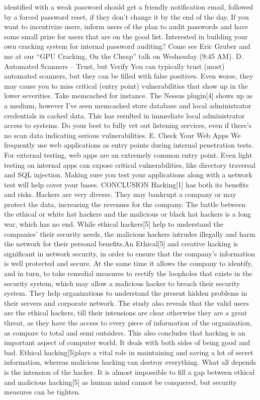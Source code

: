 identified with a weak password should get a friendly 
notification email, followed by a forced password reset, if 
they don’t change it by the end of the day. If you want to 
incentivize users, inform users of the plan to audit 
passwords and have some small prize for users that are on 
the good list. 
Interested in building your own cracking system for 
internal password auditing? Come see Eric Gruber and me 
at our “GPU Cracking, On the Cheap” talk on Wednesday 
(9:45 AM). 
D. Automated Scanners – Trust, but Verify 
You can typically trust (most) automated scanners, but they 
can be filled with false positives. Even worse, they may 
cause you to miss critical (entry point) vulnerabilities that 
show up in the lower severities. Take memcached for 
instance. The Nessus plugin[4] shows up as a medium, 
however I’ve seen memcached store database and local 
administrator credentials in cached data. This has resulted 
in immediate local administrator access to systems. Do 
your best to fully vet out listening services, even if there’s 
no scan data indicating serious vulnerabilities. 
E. Check Your Web Apps 
We frequently use web applications as entry points during 
internal penetration tests. For external testing, web apps are 
an extremely common entry point. Even light testing on 
internal apps can expose critical vulnerabilities, like 
directory traversal and SQL injection. Making sure you test 
your applications along with a network test will help cover 
your bases. 
CONCLUSION 
Hacking[1] has both its benefits and risks. Hackers are very 
diverse. They may bankrupt a company or may protect the 
data, increasing the revenues for the company. The battle 
between the ethical or white hat hackers and the malicious 
or black hat hackers is a long war, which has no end. While 
ethical hackers[5] help to understand the companies’ their 
security needs, the malicious hackers intrudes illegally and 
harm the network for their personal benefits.An Ethical[5] 
and creative hacking is significant in network security, in 
order to ensure that the company’s information is well 
protected and secure. At the same time it allows the 
company to identify, and in turn, to take remedial measures 
to rectify the loopholes that exists in the security system, 
which may allow a malicious hacker to breach their 
security system. They help organizations to understand the 
present hidden problems in their servers and corporate 
network. The study also reveals that the valid users are the 
ethical hackers, till their intensions are clear otherwise they 
are a great threat, as they have the access to every piece of 
information of the organization, as compare to total and 
semi outsiders. 
This also concludes that hacking is an important aspect of 
computer world. It deals with both sides of being good and 
bad. Ethical hacking[5]plays a vital role in maintaining and 
saving a lot of secret information, whereas malicious 
hacking can destroy everything. What all depends is the 
intension of the hacker. It is almost impossible to fill a gap 
between ethical and malicious hacking[5] as human mind 
cannot be conquered, but security measures can be tighten. 